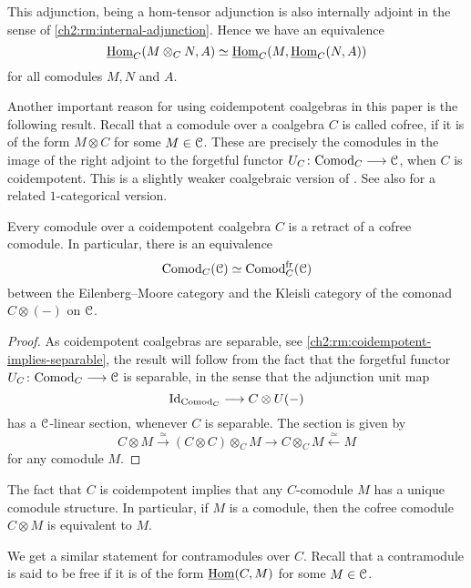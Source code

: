 \begin{remark}
    This adjunction, being a hom-tensor adjunction is also internally adjoint in the sense of \cref{ch2:rm:internal-adjunction}. Hence we have an equivalence 
    \[\operatorname{\underline{Hom}}_C(M\otimes_C N, A) \simeq \operatorname{\underline{Hom}}_C(M, \operatorname{\underline{Hom}}_C(N, A))\]
    for all comodules $M, N$ and $A$. 
\end{remark}

Another important reason for using coidempotent coalgebras in this paper is the following result. Recall that a comodule over a coalgebra $C$ is called cofree, if it is of the form $M\otimes C$ for some $M\in \EuScript{C}$. These are precisely the comodules in the image of the right adjoint to the forgetful functor $U_C\colon\mathrm{Comod}_C\longrightarrow \EuScript{C}$, when $C$ is coidempotent. This is a slightly weaker coalgebraic version of \cite[1.13, 1.14]{ramzi_2023}. See also \cite[3.6]{brzezinski_2010} for a related $1$-categorical version. 

\begin{lemma}
    \label{ch2:lm:comod-over-separable-are-cofree}
    Every comodule over a coidempotent coalgebra $C$ is a retract of a cofree comodule. In particular, there is an equivalence 
    \[\mathrm{Comod}_C(\EuScript{C})\simeq \mathrm{Comod}_C^{\mathrm{fr}}(\EuScript{C})\]
    between the Eilenberg--Moore category and the Kleisli category of the comonad $C\otimes (-)$ on $\EuScript{C}$. 
\end{lemma}
\begin{proof}
    As coidempotent coalgebras are separable, see \cref{ch2:rm:coidempotent-implies-separable}, the result will follow from the fact that the forgetful functor $U_C\colon \mathrm{Comod}_C\longrightarrow \EuScript{C}$ is separable, in the sense that the adjunction unit map 
    \[\mathrm{Id}_{\mathrm{Comod}_C}\longrightarrow C\otimes U(-)\]
    has a $\EuScript{C}$-linear section, whenever $C$ is separable. The section is given by 
    \[C\otimes M \overset{\simeq}\to (C\otimes C)\otimes_C M \to C\otimes_C M\overset{\simeq}\longleftarrow M\]
    for any comodule $M$. 
\end{proof}

\begin{remark}
    \label{ch2:rm:unique-structure}
    The fact that $C$ is coidempotent implies that any $C$-comodule $M$ has a unique comodule structure. In particular, if $M$ is a comodule, then the cofree comodule $C\otimes M$ is equivalent to $M$. 
\end{remark}

We get a similar statement for contramodules over $C$. Recall that a contramodule is said to be free if it is of the form $\operatorname{\underline{Hom}}(C,M)$ for some $M\in \EuScript{C}$. 

